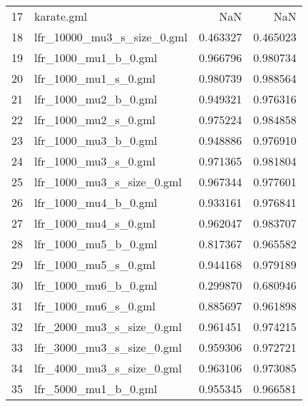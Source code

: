 \begin{tabular}{llrr}
17 &                  karate.gml &                           NaN &                         NaN \\
18 &  lfr\_10000\_mu3\_s\_size\_0.gml &                      0.463327 &                    0.465023 \\
19 &        lfr\_1000\_mu1\_b\_0.gml &                      0.966796 &                    0.980734 \\
20 &        lfr\_1000\_mu1\_s\_0.gml &                      0.980739 &                    0.988564 \\
21 &        lfr\_1000\_mu2\_b\_0.gml &                      0.949321 &                    0.976316 \\
22 &        lfr\_1000\_mu2\_s\_0.gml &                      0.975224 &                    0.984858 \\
23 &        lfr\_1000\_mu3\_b\_0.gml &                      0.948886 &                    0.976910 \\
24 &        lfr\_1000\_mu3\_s\_0.gml &                      0.971365 &                    0.981804 \\
25 &   lfr\_1000\_mu3\_s\_size\_0.gml &                      0.967344 &                    0.977601 \\
26 &        lfr\_1000\_mu4\_b\_0.gml &                      0.933161 &                    0.976841 \\
27 &        lfr\_1000\_mu4\_s\_0.gml &                      0.962047 &                    0.983707 \\
28 &        lfr\_1000\_mu5\_b\_0.gml &                      0.817367 &                    0.965582 \\
29 &        lfr\_1000\_mu5\_s\_0.gml &                      0.944168 &                    0.979189 \\
30 &        lfr\_1000\_mu6\_b\_0.gml &                      0.299870 &                    0.680946 \\
31 &        lfr\_1000\_mu6\_s\_0.gml &                      0.885697 &                    0.961898 \\
32 &   lfr\_2000\_mu3\_s\_size\_0.gml &                      0.961451 &                    0.974215 \\
33 &   lfr\_3000\_mu3\_s\_size\_0.gml &                      0.959306 &                    0.972721 \\
34 &   lfr\_4000\_mu3\_s\_size\_0.gml &                      0.963106 &                    0.973085 \\
35 &        lfr\_5000\_mu1\_b\_0.gml &                      0.955345 &                    0.966581 \\

\end{tabular}
